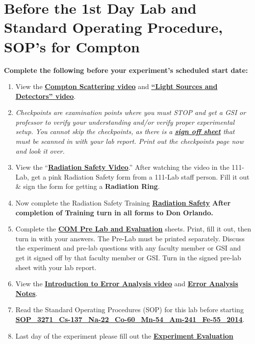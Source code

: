 \documentclass{../lab}
\begin{document}
\section{Before the 1st Day Lab and Standard Operating Procedure, SOP's for Compton}
\label{sec:BeforeTheLab}

\textbf{Complete the following before your experiment's scheduled start date:}

\begin{enumerate}
    \item View the \href{http://youtu.be/PVgqyf3kNRs}{\textbf{Compton Scattering video}} and \href{http://youtu.be/lQKLakISoBA}{\textbf{``Light Sources and Detectors'' video}}.

    \item \emph{Checkpoints are examination points where you must STOP and get a GSI or professor to verify your understanding and/or verify proper experimental setup. You cannot skip the checkpoints, as there is a \href{http://experimentationlab.berkeley.edu/node/132}{\textbf{sign off sheet}} that must be scanned in with your lab report. Print out the checkpoints page now and look it over.}

    \item View the     ``\href{http://youtu.be/KHxtzF5pZZM}{\textbf{Radiation Safety Video}}.'' After watching the video in the 111-Lab, get a pink Radiation Safety form from a 111-Lab staff person. Fill it out \& sign the form for getting a \textbf{Radiation Ring}.

    \item Now complete the Radiation Safety Training \href{http://experimentationlab.berkeley.edu/RadiationSafety}{\textbf{Radiation Safety}} \textbf{After completion of Training turn in all forms to Don Orlando.}

    \item Complete the \href{http://experimentationlab.berkeley.edu/COMPreLab}{\textbf{COM Pre Lab and Evaluation}} sheets. Print, fill it out, then turn in with your answers. The Pre-Lab must be printed separately. Discuss the experiment and pre-lab questions with any faculty member or GSI and get it signed off by that faculty member or GSI. Turn in the signed pre-lab sheet with your lab report.

    \item View the \href{\ErrorAnalysisVideo}{\textbf{Introduction to Error Analysis video}} and \href{\ErrorAnalysisNotes}{\textbf{\textbf{Error Analysis Notes}}}.

    \item Read the Standard Operating Procedures (SOP) for this lab before starting \href{http://experimentationlab.berkeley.edu/sites/default/files/images/SOP\_3271\_Cs-137\_Na-22\_Co-60\_Mn-54\_Am-241\_Fe-55\_2014.pdf}{\textbf{SOP\_3271\_Cs-137\_Na-22\_Co-60\_Mn-54\_Am-241\_Fe-55\_2014}}.

    \item Last day of the experiment please fill out the \href{\ExperimentEvaluation}{\textbf{Experiment Evaluation}}

\end{enumerate}
\end{document}
